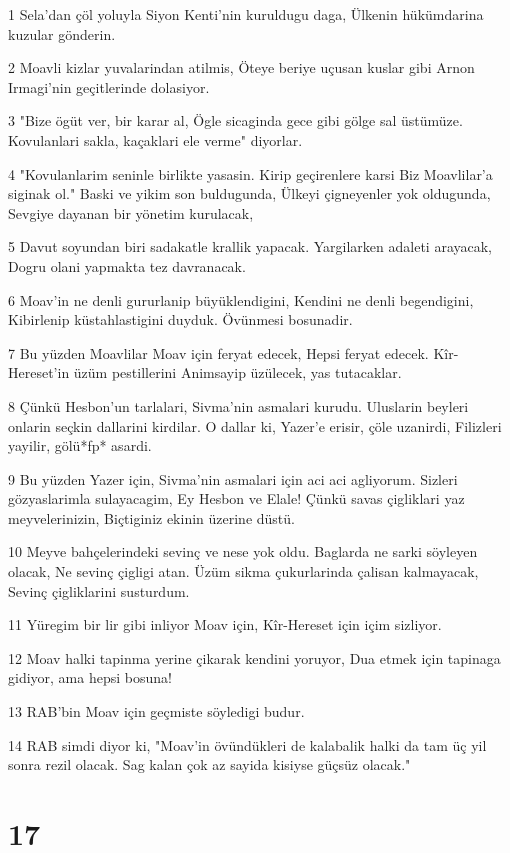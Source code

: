 \par 1 Sela'dan çöl yoluyla Siyon Kenti'nin kuruldugu daga, Ülkenin hükümdarina kuzular gönderin.
\par 2 Moavli kizlar yuvalarindan atilmis, Öteye beriye uçusan kuslar gibi Arnon Irmagi'nin geçitlerinde dolasiyor.
\par 3 "Bize ögüt ver, bir karar al, Ögle sicaginda gece gibi gölge sal üstümüze. Kovulanlari sakla, kaçaklari ele verme" diyorlar.
\par 4 "Kovulanlarim seninle birlikte yasasin. Kirip geçirenlere karsi Biz Moavlilar'a siginak ol." Baski ve yikim son buldugunda, Ülkeyi çigneyenler yok oldugunda, Sevgiye dayanan bir yönetim kurulacak,
\par 5 Davut soyundan biri sadakatle krallik yapacak. Yargilarken adaleti arayacak, Dogru olani yapmakta tez davranacak.
\par 6 Moav'in ne denli gururlanip büyüklendigini, Kendini ne denli begendigini, Kibirlenip küstahlastigini duyduk. Övünmesi bosunadir.
\par 7 Bu yüzden Moavlilar Moav için feryat edecek, Hepsi feryat edecek. Kîr-Hereset'in üzüm pestillerini Animsayip üzülecek, yas tutacaklar.
\par 8 Çünkü Hesbon'un tarlalari, Sivma'nin asmalari kurudu. Uluslarin beyleri onlarin seçkin dallarini kirdilar. O dallar ki, Yazer'e erisir, çöle uzanirdi, Filizleri yayilir, gölü*fp* asardi.
\par 9 Bu yüzden Yazer için, Sivma'nin asmalari için aci aci agliyorum. Sizleri gözyaslarimla sulayacagim, Ey Hesbon ve Elale! Çünkü savas çigliklari yaz meyvelerinizin, Biçtiginiz ekinin üzerine düstü.
\par 10 Meyve bahçelerindeki sevinç ve nese yok oldu. Baglarda ne sarki söyleyen olacak, Ne sevinç çigligi atan. Üzüm sikma çukurlarinda çalisan kalmayacak, Sevinç çigliklarini susturdum.
\par 11 Yüregim bir lir gibi inliyor Moav için, Kîr-Hereset için içim sizliyor.
\par 12 Moav halki tapinma yerine çikarak kendini yoruyor, Dua etmek için tapinaga gidiyor, ama hepsi bosuna!
\par 13 RAB'bin Moav için geçmiste söyledigi budur.
\par 14 RAB simdi diyor ki, "Moav'in övündükleri de kalabalik halki da tam üç yil sonra rezil olacak. Sag kalan çok az sayida kisiyse güçsüz olacak."

\chapter{17}

